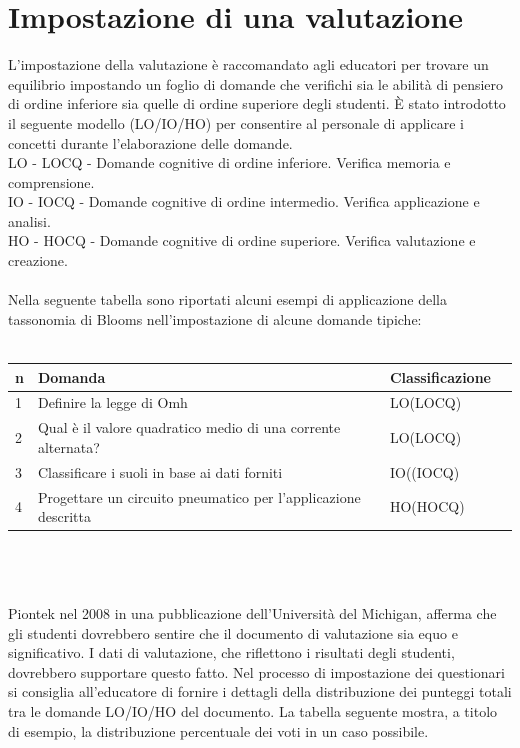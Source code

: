 \section{Impostazione di una valutazione}
\label{sec:problem}
L'impostazione della valutazione è raccomandato agli educatori per trovare un equilibrio impostando un foglio di domande che verifichi sia le abilità di pensiero di ordine inferiore sia quelle di ordine superiore degli studenti.
È stato introdotto il seguente modello (LO/IO/HO) per consentire al personale di applicare i concetti durante l'elaborazione delle domande.\\
LO - LOCQ - Domande cognitive di ordine inferiore. Verifica memoria e comprensione.\\
IO - IOCQ - Domande cognitive di ordine intermedio. Verifica applicazione e analisi.\\
HO - HOCQ - Domande cognitive di ordine superiore. Verifica valutazione e creazione.\\
\\
Nella seguente tabella sono riportati alcuni esempi di applicazione della tassonomia di Blooms nell'impostazione di alcune domande tipiche:\\
\\
\begin{tabular}{|l|l|l|r|}
  \hline
  n & Domanda & Classificazione \\
  \hline
  1 & Definire la legge di Omh & LO(LOCQ)\\
  \hline
  2 & Qual è il valore quadratico medio di una corrente alternata? & LO(LOCQ) \\
  \hline
  3 & Classificare i suoli in base ai dati forniti & IO((IOCQ)\\
  \hline
  4 & Progettare un circuito pneumatico per l'applicazione descritta & HO(HOCQ)\\
  \hline
  \end{tabular}\\
\\
\\
Piontek nel 2008 in una pubblicazione dell'Università del Michigan, afferma che gli studenti dovrebbero sentire che il documento di valutazione sia equo e significativo. I dati di valutazione, che riflettono i risultati degli studenti, dovrebbero supportare questo fatto.
Nel processo di impostazione dei questionari si consiglia all’educatore di fornire i dettagli della distribuzione dei punteggi totali tra le domande LO/IO/HO del documento. La tabella seguente mostra, a titolo di esempio, la distribuzione percentuale dei voti in un caso possibile.\\
